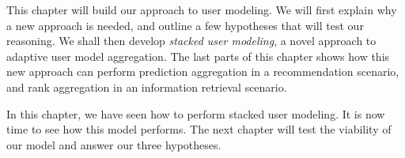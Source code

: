 This chapter will build our approach to user modeling.
We will first explain why a new approach is needed,
and outline a few hypotheses that will test our reasoning.
We shall then develop \emph{stacked user modeling},
a novel approach to adaptive user model aggregation.
The last parts of this chapter shows how this new approach
can perform prediction aggregation in a recommendation scenario,
and rank aggregation in an information retrieval scenario.








\hr

In this chapter, we have seen how to perform stacked user modeling.
It is now time to see how this model performs.
The next chapter will test the viability of 
our model and answer our three hypotheses.

